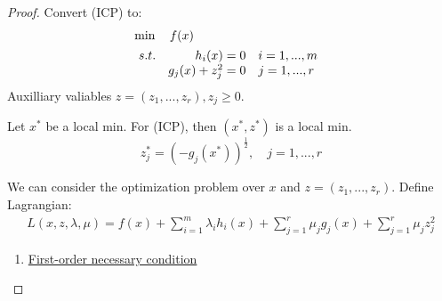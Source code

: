 \documentclass[11pt,a4paper]{article}
\begin{document}
\begin{proof}
Convert (ICP) to:
\begin{align*}
    &\min\quad f(x)\\
    &\begin{array}{r@{\quad}r@{}l@{\quad}l}
    s.t.
    &h_i(x)=0\quad&i=1,...,m\\
    &g_j(x)+z_j^2=0\quad&j=1,...,r\\
\end{array}
\end{align*}
Auxilliary valiables $z=(z_1,...,z_r),z_j\geq 0$.

Let $x^*$ be a local min. For (ICP), then $(x^*,z^*)$ is a local min. $$z_j^*=(-g_j(x^*))^\frac{1}{2},\quad j=1,...,r$$

We can consider the optimization problem over $x$ and $z=(z_1,...,z_r)$. Define Lagrangian:
\begin{equation}
    \begin{aligned}
        L(x,z,\lambda,\mu)=f(x)+\sum_{i=1}^m\lambda_i h_i(x)+\sum_{j=1}^r\mu_j g_j(x)+\sum_{j=1}^r\mu_j z_j^2
    \end{aligned}
    \nonumber
\end{equation}
\begin{enumerate}[(1)]
    \item \underline{First-order necessary condition}
    

\end{enumerate}
\end{proof}
\end{document}
